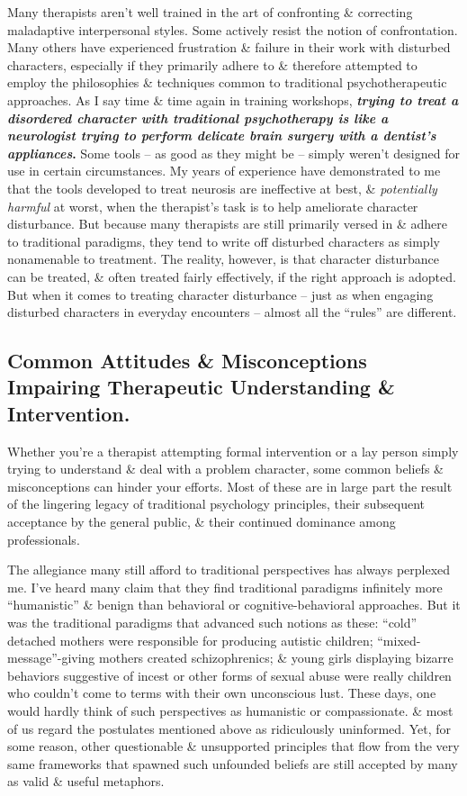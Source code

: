 \documentclass{article}
\numberwithin{equation}{section}
\begin{document}
Many therapists aren't well trained in the art of confronting \& correcting maladaptive interpersonal styles. Some actively resist the notion of confrontation. Many others have experienced frustration \& failure in their work with disturbed characters, especially if they primarily adhere to \& therefore attempted to employ the philosophies \& techniques common to traditional psychotherapeutic approaches. As I say time \& time again in training workshops, \textbf{\textit{trying to treat a disordered character with traditional psychotherapy is like a neurologist trying to perform delicate brain surgery with a dentist's appliances}.} Some tools -- as good as they might be -- simply weren't designed for use in certain circumstances. My years of experience have demonstrated to me that the tools developed to treat neurosis are ineffective at best, \& \textit{potentially harmful} at worst, when the therapist's task is to help ameliorate character disturbance. But because many therapists are still primarily versed in \& adhere to traditional paradigms, they tend to write off disturbed characters as simply nonamenable to treatment. The reality, however, is that character disturbance can be treated, \& often treated fairly effectively, if the right approach is adopted. But when it comes to treating character disturbance -- just as when engaging disturbed characters in everyday encounters -- almost all the ``rules'' are different.

\subsection{Common Attitudes \& Misconceptions Impairing Therapeutic Understanding \& Intervention.} Whether you're a therapist attempting formal intervention or a lay person simply trying to understand \& deal with a problem character, some common beliefs \& misconceptions can hinder your efforts. Most of these are in large part the result of the lingering legacy of traditional psychology principles, their subsequent acceptance by the general public, \& their continued dominance among professionals.

The allegiance many still afford to traditional perspectives has always perplexed me. I've heard many claim that they find traditional paradigms infinitely more ``humanistic'' \& benign than behavioral or cognitive-behavioral approaches. But it was the traditional paradigms that advanced such notions as these: ``cold'' detached mothers were responsible for producing autistic children; ``mixed-message''-giving mothers created schizophrenics; \& young girls displaying bizarre behaviors suggestive of incest or other forms of sexual abuse were really children who couldn't come to terms with their own unconscious lust. These days, one would hardly think of such perspectives as humanistic or compassionate. \& most of us regard the postulates mentioned above as ridiculously uninformed. Yet, for some reason, other questionable \& unsupported principles that flow from the very same frameworks that spawned such unfounded beliefs are still accepted by many as valid \& useful metaphors.
\end{document}
